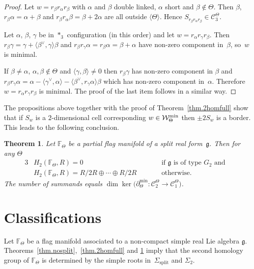 \documentclass[pdftex]{sigma}
\numberwithin{equation}{section}
\newtheorem{Theorem}{Theorem}[section]
\begin{document}
\begin{proof}Let $w= r_\beta r_\alpha r_\beta$ with $\alpha$ and $\beta$ double linked, $\alpha$ short and $\beta\notin\Theta$. Then $\beta$, $r_\beta\alpha=\alpha+\beta $ and $r_\beta r_\alpha\beta=\beta+2\alpha$ are all outside $\langle \Theta\rangle$. Hence $S_{r_\beta r_\alpha r_\beta}\in \mathcal{C}_3^\Theta$.

Let $\alpha$, $\beta$, $\gamma$ be in $*_3$ configuration (in this order) and let $w= r_{\alpha }r_{\gamma }r_{\beta }$. Then $r_\beta\gamma=\gamma+\langle \beta^\vee,\gamma\rangle\beta$ and $r_\beta r_\gamma\alpha=r_\beta\alpha=\beta+\alpha$ have non-zero component in~$\beta$, so~$w$ is minimal.

If $\beta\neq \alpha$, $\alpha,\beta\notin\Theta$ and $\langle\gamma,\beta\rangle\neq 0$ then $r_\beta\gamma$ has non-zero component in $\beta$ and $r_\beta r_\gamma\alpha=\alpha-\langle\gamma^\vee,\alpha\rangle-\langle
\beta^\vee,r_\gamma\alpha\rangle\beta$ which has non-zero component in~$\alpha$. Therefore $w=r_\alpha r_\gamma r_\beta $ is minimal. The proof of the last item follows in a similar way.
\end{proof}

The propositions above together with the proof of Theorem~\ref{thm.2homfull} show that if $S_w$ is a $2$-di\-men\-sional cell corresponding $w\in \mathcal W_\Theta^{\rm min}$ then $\pm 2 S_w$ is a border. This leads to the following conclusion.

\begin{Theorem}\label{thm.2homint}Let $\mathbb{F}_{\Theta }$ be a partial flag manifold of a split real form~$\mathfrak{g}$. Then for any $\Theta $
\begin{alignat*}{3}
& H_{2} ( \mathbb{F}_{\Theta },R ) = 0 \qquad && \mbox{if }\mathfrak{g} \mbox{ is of type }G_{2}\mbox{ and}& \\
& H_{2} ( \mathbb{F}_{\Theta },R ) = R/2R\oplus \cdots \oplus R/2R \qquad && \mbox{otherwise}. &
\end{alignat*}
The number of summands equals $\dim \ker \big(\partial _{\Theta }^{\min }\colon \mathcal{C}_{2}^{\Theta }\longrightarrow \mathcal{C}_{1}^{\Theta }\big)$.
\end{Theorem}

\section{Classifications}

Let $\mathbb{F}_{\Theta }$ be a flag manifold associated to a non-compact simple real Lie algebra $\mathfrak{g}$. Theorems~\ref{thm.nosplit},~\ref{thm.2homfull} and \ref{thm.2homint} imply that the second homology group of $\mathbb{F}_{\Theta }$ is determined by the simple roots in~$\Sigma _{\mathrm{split}}$ and $\Sigma _{2}$.
\end{document}
